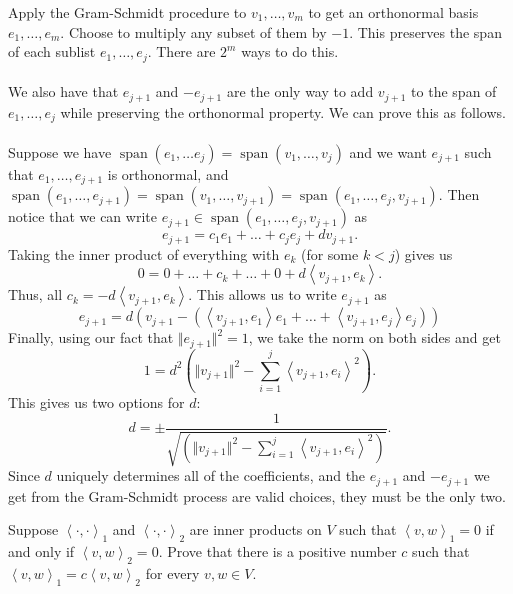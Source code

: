 \documentclass[12pt, letterpaper]{hmcpset}
\begin{document}
\begin{solution}
	Apply the Gram-Schmidt procedure to $v_1, \dots, v_m$ to get an orthonormal basis $e_1, \dots, e_m$. Choose to multiply any subset of them by $-1$. This preserves the span of each sublist $e_1, \dots, e_j$. There are $2^m$ ways to do this. \\\\
	We also have that $e_{j + 1}$ and $-e_{j + 1}$ are the only way to add $v_{j + 1}$ to the span of $e_1, \dots, e_j$ while preserving the orthonormal property. We can prove this as follows. \\\\
	Suppose we have $\operatorname{span}(e_1, \dots e_j) = \operatorname{span}(v_1, \dots, v_j)$ and we want $e_{j + 1}$ such that $e_1, \dots, e_{j + 1}$ is orthonormal, and $\operatorname{span}(e_1, \dots, e_{j + 1}) = \operatorname{span}(v_1, \dots, v_{j + 1}) = \operatorname{span}(e_1, \dots, e_j, v_{j + 1})$. Then notice that we can write $e_{j + 1} \in \operatorname{span}(e_1, \dots, e_j, v_{j + 1})$ as
	\[
		e_{j + 1} = c_1 e_1 + \dots + c_j e_j + d v_{j + 1}.
	\]
	Taking the inner product of everything with $e_{k}$ (for some $k < j$) gives us
	\[
		0 = 0 + \dots + c_k + \dots + 0 + d \left < v_{j + 1}, e_k \right >.
	\]
	Thus, all $c_k = - d \left < v_{j + 1}, e_k \right >$. This allows us to write $e_{j + 1}$ as
	\[
		e_{j + 1} = d ( v_{j + 1} - ( \left < v_{j + 1}, e_1 \right > e_1 + \dots + \left < v_{j + 1}, e_j \right > e_j ) )
	\]
	Finally, using our fact that $\Vert e_{j + 1} \Vert^2 = 1$, we take the norm on both sides and get
	\[
		1 = d^2 \left ( \Vert v_{j + 1} \Vert^2 - \sum_{i = 1}^j \left < v_{j + 1}, e_i \right >^2 \right ).
	\]
	This gives us two options for $d$:
	\[
		d = \pm \frac{1}{\sqrt{\left ( \Vert v_{j + 1} \Vert^2 - \sum_{i = 1}^j \left < v_{j + 1}, e_i \right >^2 \right )}}.
	\]
	Since $d$ uniquely determines all of the coefficients, and the $e_{j + 1}$ and $- e_{j + 1}$ we get from the Gram-Schmidt process are valid choices, they must be the only two.
\end{solution}

\pagebreak

\begin{problem}[11.]
	Suppose $\left < \cdot, \cdot \right >_1$ and $\left < \cdot, \cdot \right >_2$ are inner products on $V$ such that $\left < v, w \right >_1 = 0$ if and only if $\left < v, w \right >_2 = 0$. Prove that there is a positive number $c$ such that $\left < v, w \right >_1 = c \left < v, w \right >_2$ for every $v, w \in V$.
\end{problem}
\end{document}
